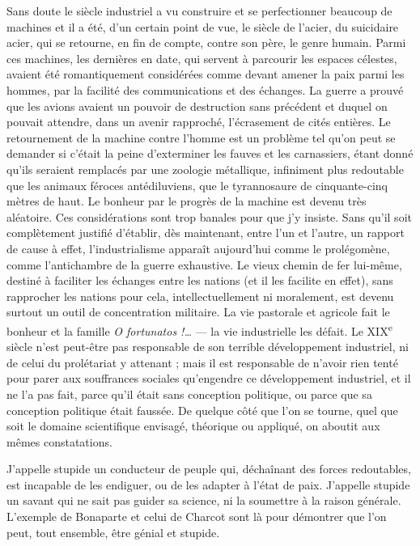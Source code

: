 \documentclass[french,twoside]{book} %
\newcommand\chapterclose{} %
\renewcommand\chapterclose{} %
\begin{document}
Sans doute le siècle industriel a vu construire et se perfectionner beaucoup de machines et il a été, d’un certain point de vue, le siècle de l’acier, du suicidaire acier, qui se retourne, en fin de compte, contre son père, le genre humain. Parmi ces machines, les dernières en date, qui servent à parcourir les espaces célestes, avaient été romantiquement considérées comme devant amener la paix parmi les hommes, par la facilité des communications et des échanges. La guerre a prouvé que les avions avaient un pouvoir de destruction sans précédent et duquel on pouvait attendre, dans un avenir rapproché, l’écrasement de cités entières. Le retournement de la machine contre l’homme est un problème tel qu’on peut se demander si c’était la peine d’exterminer les fauves et les carnassiers, étant donné qu’ils seraient remplacés par une zoologie métallique, infiniment plus redoutable que les animaux féroces antédiluviens, que le tyrannosaure de cinquante-cinq mètres de haut. Le bonheur par le progrès de la machine est devenu très aléatoire. Ces considérations sont trop banales pour que j’y insiste. Sans qu’il soit complètement justifié d’établir, dès maintenant, entre l’un et l’autre, un rapport de cause à effet, l’industrialisme apparaît aujourd’hui comme le prolégomène, comme l’antichambre de la guerre exhaustive. Le vieux chemin de fer lui-même, destiné à faciliter les échanges entre les nations (et il les facilite en effet), sans rapprocher les nations pour cela, intellectuellement ni moralement, est devenu surtout un outil de concentration militaire. La vie pastorale et agricole fait le bonheur et la famille {\itshape O fortunatos !…} — la vie industrielle les défait. Le XIX\textsuperscript{e} siècle n’est peut-être pas responsable de son terrible développement industriel, ni de celui du prolétariat y attenant ; mais il est responsable de n’avoir rien tenté pour parer aux souffrances sociales qu’engendre ce développement industriel, et il ne l’a pas fait, parce qu’il était sans conception politique, ou parce que sa conception politique était faussée. De quelque côté que l’on se tourne, quel que soit le domaine scientifique envisagé, théorique ou appliqué, on aboutit aux mêmes constatations.\par
J’appelle stupide un conducteur de peuple qui, déchaînant des forces redoutables, est incapable de les endiguer, ou de les adapter à l’état de paix. J’appelle stupide un savant qui ne sait pas guider sa science, ni la soumettre à la raison générale. L’exemple de Bonaparte et celui de Charcot sont là pour démontrer que l’on peut, tout ensemble, être génial et stupide.
\chapterclose
\end{document}

